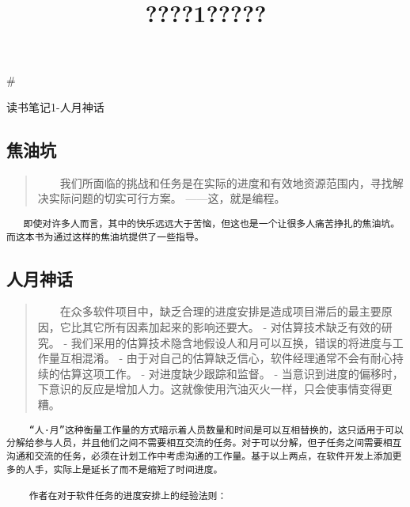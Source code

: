 \documentclass[11pt]{article}
\title{????1?????}
\begin{document}
    
    
    \maketitle
    
    

    
    \#

读书笔记1-人月神话

\hypertarget{ux7126ux6cb9ux5751}{%
\subsection{焦油坑}\label{ux7126ux6cb9ux5751}}

\begin{quote}
  我们所面临的挑战和任务是在实际的进度和有效地资源范围内，寻找解决实际问题的切实可行方案。
------这，就是编程。
\end{quote}

\begin{verbatim}
   即使对许多人而言，其中的快乐远远大于苦恼，但这也是一个让很多人痛苦挣扎的焦油坑。而这本书为通过这样的焦油坑提供了一些指导。
\end{verbatim}

\hypertarget{ux4ebaux6708ux795eux8bdd}{%
\subsection{人月神话}\label{ux4ebaux6708ux795eux8bdd}}

\begin{quote}
  在众多软件项目中，缺乏合理的进度安排是造成项目滞后的最主要原因，它比其它所有因素加起来的影响还要大。
- 对估算技术缺乏有效的研究。 -
我们采用的估算技术隐含地假设人和月可以互换，错误的将进度与工作量互相混淆。
- 由于对自己的估算缺乏信心，软件经理通常不会有耐心持续的估算这项工作。 -
对进度缺少跟踪和监督。 -
当意识到进度的偏移时，下意识的反应是增加人力。这就像使用汽油灭火一样，只会使事情变得更糟。
\end{quote}

\begin{verbatim}
    “人·月”这种衡量工作量的方式暗示着人员数量和时间是可以互相替换的，这只适用于可以分解给参与人员，并且他们之间不需要相互交流的任务。对于可以分解，但子任务之间需要相互沟通和交流的任务，必须在计划工作中考虑沟通的工作量。基于以上两点，在软件开发上添加更多的人手，实际上是延长了而不是缩短了时间进度。
    
    作者在对于软件任务的进度安排上的经验法则：
\end{verbatim}
\end{document}
